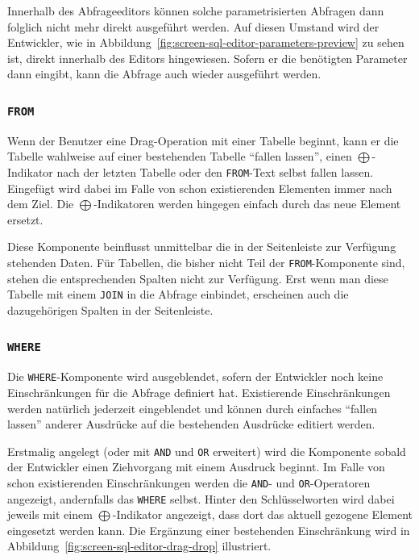 Innerhalb des Abfrageeditors können solche parametrisierten Abfragen dann folglich nicht mehr direkt ausgeführt werden. Auf diesen Umstand wird der Entwickler, wie in Abbildung~\ref{fig:screen-sql-editor-parameters-preview} zu sehen ist, direkt innerhalb des Editors hingewiesen. Sofern er die benötigten Parameter dann eingibt, kann die Abfrage auch wieder ausgeführt werden.

\subsubsection{\texttt{FROM}}

Wenn der Benutzer eine Drag-Operation mit einer Tabelle beginnt, kann er die Tabelle wahlweise auf einer bestehenden Tabelle "`fallen lassen"', einen $\bigoplus$-Indikator nach der letzten Tabelle oder den \texttt{FROM}-Text selbst fallen lassen. Eingefügt wird dabei im Falle von schon existierenden Elementen immer nach dem Ziel. Die $\bigoplus$-Indikatoren werden hingegen einfach durch das neue Element ersetzt.

Diese Komponente beinflusst unmittelbar die in der Seitenleiste zur Verfügung stehenden Daten. Für Tabellen, die bisher nicht Teil der \texttt{FROM}-Komponente sind, stehen die entsprechenden Spalten nicht zur Verfügung. Erst wenn man diese Tabelle mit einem \texttt{JOIN} in die Abfrage einbindet, erscheinen auch die dazugehörigen Spalten in der Seitenleiste.

\subsubsection{\texttt{WHERE}}

Die \texttt{WHERE}-Komponente wird ausgeblendet, sofern der Entwickler noch keine Einschränkungen für die Abfrage definiert hat. Existierende Einschränkungen werden natürlich jederzeit eingeblendet und können durch einfaches "`fallen lassen"' anderer Ausdrücke auf die bestehenden Ausdrücke editiert werden.

Erstmalig angelegt (oder mit \texttt{AND} und \texttt{OR} erweitert) wird die Komponente sobald der Entwickler einen Ziehvorgang mit einem Ausdruck beginnt. Im Falle von schon existierenden Einschränkungen werden die \texttt{AND}- und \texttt{OR}-Operatoren angezeigt, andernfalls das \texttt{WHERE} selbst. Hinter den Schlüsselworten wird dabei jeweils mit einem $\bigoplus$-Indikator angezeigt, dass dort das aktuell gezogene Element eingesetzt werden kann. Die Ergänzung einer bestehenden Einschränkung wird in Abbildung~\ref{fig:screen-sql-editor-drag-drop} illustriert.

